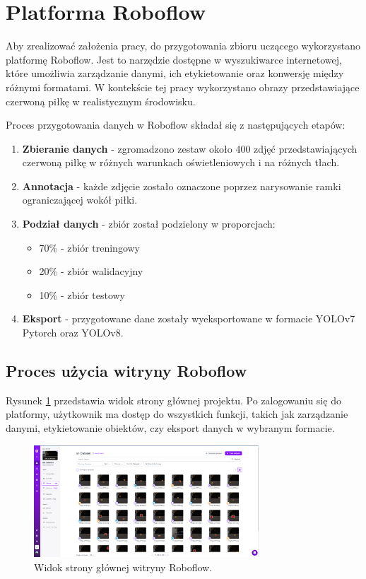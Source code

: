 \documentclass[a4paper,twoside,12pt]{book}
\begin{document}
\section{Platforma Roboflow}
Aby zrealizować założenia pracy, do przygotowania zbioru uczącego wykorzystano platformę Roboflow. Jest to narzędzie dostępne w wyszukiwarce internetowej, które umożliwia zarządzanie danymi, ich etykietowanie oraz konwersję między różnymi formatami. W kontekście tej pracy wykorzystano obrazy przedstawiające czerwoną piłkę w realistycznym środowisku.

Proces przygotowania danych w Roboflow składał się z następujących etapów:

\begin{enumerate}
	\item \textbf{Zbieranie danych} - zgromadzono zestaw około 400 zdjęć przedstawiających czerwoną piłkę w różnych warunkach oświetleniowych i na różnych tłach.
	
	\item \textbf{Annotacja} - każde zdjęcie zostało oznaczone poprzez narysowanie ramki ograniczającej wokół piłki.
		
	\item \textbf{Podział danych} - zbiór został podzielony w proporcjach:
	\begin{itemize}
		\item 70\% - zbiór treningowy
		\item 20\% - zbiór walidacyjny
		\item 10\% - zbiór testowy
	\end{itemize}
	
	\item \textbf{Eksport} - przygotowane dane zostały wyeksportowane w formacie YOLOv7 Pytorch oraz YOLOv8.
\end{enumerate}

\newpage

\subsection{Proces użycia witryny Roboflow}
Rysunek \ref{fig:roboflow-main} przedstawia widok strony głównej projektu. Po zalogowaniu się do platformy, użytkownik ma dostęp do wszystkich funkcji, takich jak zarządzanie danymi, etykietowanie obiektów, czy eksport danych w wybranym formacie.

\begin{figure}[h]
	\centering
	\includegraphics[width=0.75\textwidth]{Images/Roboflow/mainscreen.png}
	\caption{Widok strony głównej witryny Roboflow.}
	\label{fig:roboflow-main}
\end{figure}
\end{document}
